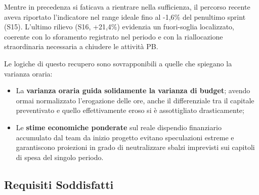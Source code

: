 \documentclass[a4paper,11pt,oneside]{scrartcl}
\begin{document}
Mentre in precedenza si faticava a rientrare nella sufficienza, il percorso recente aveva riportato l'indicatore nel range ideale fino al -1,6\% del penultimo sprint (S15). L'ultimo rilievo (S16, +21,4\%) evidenzia un fuori-soglia localizzato, coerente con lo sforamento registrato nel periodo e con la riallocazione straordinaria necessaria a chiudere le attività PB.

Le logiche di questo recupero sono sovrapponibili a quelle che spiegano la varianza oraria:
\begin{itemize}
    \item La \textbf{varianza oraria guida solidamente la varianza di budget}; avendo ormai normalizzato l'erogazione delle ore, anche il differenziale tra il capitale preventivato e quello effettivamente eroso si è assottigliato drasticamente;
    \item Le \textbf{stime economiche ponderate} sul reale dispendio finanziario accumulato dal team da inizio progetto evitano speculazioni estreme e garantiscono proiezioni in grado di neutralizzare sbalzi imprevisti sui capitoli di spesa del singolo periodo.
\end{itemize}

\subsection{Requisiti Soddisfatti}
\end{document}
